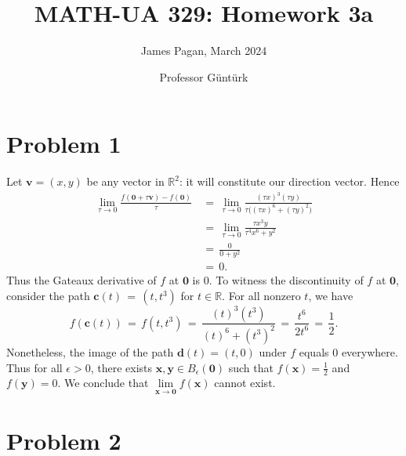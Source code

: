 \documentclass[11pt]{article}
\title{MATH-UA 329: Homework 3a}
\author{James Pagan, March 2024}
\date{Professor Güntürk}
\renewcommand{\vec}[1]{\mathbf{#1}}
\begin{document}
\maketitle
\tableofcontents
\newpage


\section{Problem 1}

Let $\vec{v} = (x, y)$ be any vector in $\mathbb{R}^{2}$: it will constitute our direction vector. Hence
\begin{align*}
  \lim\limits_{\tau \to 0} \frac{f(\vec{0} + \tau \vec{v}) - f(\vec{0})}{\tau} \, &= \, \lim\limits_{\tau \to 0} \frac{(\tau x)^{3}(\tau y)}{\tau \big((\tau x)^{6} + (\tau y)^{2}\big)} \\
                                                              & = \, \lim\limits_{\tau \to 0} \frac{\tau x^{3}y}{\tau^{4}x^{6} + y^{2}} \\
                                                              & = \, \frac{0}{0 + y^{2}} \\
                                                              & = \, 0.
\end{align*}
Thus the Gateaux derivative of $f$ at $\vec{0}$ is $0$. To witness the discontinuity of $f$ at $\vec{0}$, consider the path $\vec{c}(t) \, = \, (t, t^{3})$ for $t \in \mathbb{R}$. For all nonzero $t$, we have
\[
  f(\vec{c}(t)) \, = \, f(t, t^{3}) \, = \, \frac{(t)^{3}(t^{3})}{(t)^{6} + (t^{3})^{2}} \, = \, \frac{t^{6}}{2t^{6}} \, = \, \frac{1}{2}.
\]
Nonetheless, the image of the path $\vec{d}(t) = (t, 0)$ under $f$ equals 0 everywhere. Thus for all $\epsilon > 0$, there exists $\vec{x}, \vec{y} \in B_{\epsilon}(\vec{0})$ such that $f(\vec{x}) = \tfrac{1}{2}$ and $f(\vec{y}) = 0$. We conclude that $\lim\limits_{\vec{x} \to \vec{0}} f(\vec{x})$ cannot exist.


\section{Problem 2}
\end{document}
